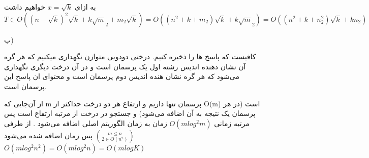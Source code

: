 به ازای 
$ x= \sqrt k$
خواهیم داشت
\begin{equation*}
    T \in O((n -\sqrt k)^2 \sqrt k + k\sqrt m_2 + m_2\sqrt k) = O((n^2+k+m_2) \sqrt k + k \sqrt m_2) = O((n^2+k+n_2^2) \sqrt k + k n_2)
\end{equation*}

ب)

کافیست که پاسخ ها را ذخیره کنیم.
درختی دودویی متوازن نگهداری میکنیم که هر گره آن نشان دهنده اندیس رشته اول یک پرسمان است و در آن درخت دیگری نگهداری می‌شود که هر گره
نشان هنده اندیس دوم پرسمان است
و
محتوای ان پاسخ این پرسمان است.

از آن‌جایی که 
m 
پرسمان تنها داریم و ارتفاع 
هر دو درخت 
حداکثر 
از 
O(m)
است 
(در هر پرسمان یک نتیجه به آن اضافه می‌شود)
و جستجو در درخت از مرتبه ارتفاع است
پس 
مرتبه زمانی 
$O(m log^2 m)$
زمان به زمان الگوریتم اصلی اضافه می‌شود
.
از طرفی 
$m \leq n \choose 2 \in O(n^2)$
پس 
زمان اضافه شده می‌شود
$O(m log^2 n^2) = O(mlog^2n) = O(mlogK)$